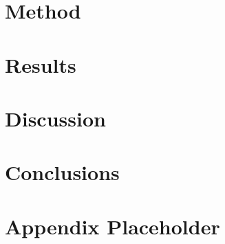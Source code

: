 \documentclass[a4paper,11pt,oldfontcommands]{packages/kth-mag}
\begin{document}
\chapter{Method}

\chapter{Results}

\chapter{Discussion}

\chapter{Conclusions}




\appendix
\addappheadtotoc
\chapter{Appendix Placeholder}
\label{appA}
\end{document}
